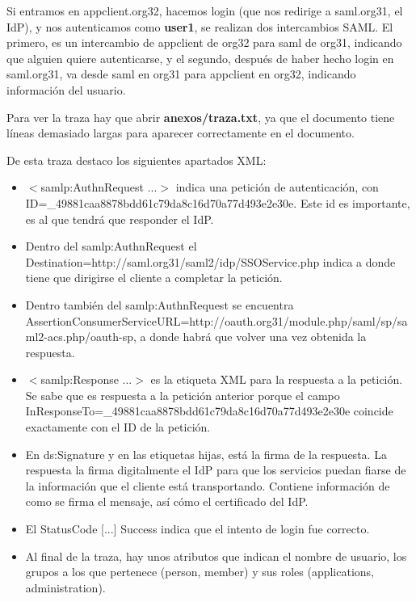 \documentclass[]{article}
\begin{document}
Si entramos en appclient.org32, hacemos login (que nos redirige a saml.org31, el IdP), y nos autenticamos como \textbf{user1}, se realizan dos intercambios SAML. El primero, es un intercambio de appclient de org32 para saml de org31, indicando que alguien quiere autenticarse, y el segundo, después de haber hecho login en saml.org31, va desde saml en org31 para appclient en org32, indicando información del usuario.

Para ver la traza hay que abrir \noindent \textbf{anexos/traza.txt}, ya que el documento tiene líneas demasiado largas para aparecer correctamente en el documento. 

De esta traza destaco los siguientes apartados XML:

\begin{itemize}
	\item $<$samlp:AuthnRequest ...$>$ indica una petición de autenticación, con ID=\_49881caa8878bdd61c79da8c16d70a77d493e2e30e. Este id es importante, es al que tendrá que responder el IdP.
	\item Dentro del samlp:AuthnRequest el Destination=http://saml.org31/saml2/idp/SSOService.php indica a donde tiene que dirigirse el cliente a completar la petición.
	\item Dentro también del samlp:AuthnRequest se encuentra AssertionConsumerServiceURL=http://oauth.org31/module.php/saml/sp/saml2-acs.php/oauth-sp, a donde habrá que volver una vez obtenida la respuesta.
	\item $<$samlp:Response ...$>$ es la etiqueta XML para la respuesta a la petición. Se sabe que es respuesta a la petición anterior porque el campo InResponseTo=\_49881caa8878bdd61c79da8c16d70a77d493e2e30e coincide exactamente con el ID de la petición.
	\item En ds:Signature y en las etiquetas hijas, está la firma de la respuesta. La respuesta la firma digitalmente el IdP para que los servicios puedan fiarse de la información que el cliente está transportando. Contiene información de como se firma el mensaje, así cómo el certificado del IdP.
	\item El StatusCode [...] Success indica que el intento de login fue correcto. 
	\item Al final de la traza, hay unos atributos que indican el nombre de usuario, los grupos a los que pertenece (person, member) y sus roles (applications, administration).
\end{itemize}
\end{document}
